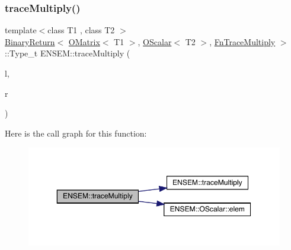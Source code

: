\subsubsection{\texorpdfstring{traceMultiply()}{traceMultiply()}\hspace{0.1cm}{\footnotesize\ttfamily [2/3]}}
{\footnotesize\ttfamily template$<$class T1 , class T2 $>$ \\
\mbox{\hyperlink{structENSEM_1_1BinaryReturn}{Binary\+Return}}$<$ \mbox{\hyperlink{classENSEM_1_1OMatrix}{O\+Matrix}}$<$ T1 $>$, \mbox{\hyperlink{classENSEM_1_1OScalar}{O\+Scalar}}$<$ T2 $>$, \mbox{\hyperlink{structENSEM_1_1FnTraceMultiply}{Fn\+Trace\+Multiply}} $>$\+::Type\+\_\+t E\+N\+S\+E\+M\+::trace\+Multiply (\begin{DoxyParamCaption}\item[{const \mbox{\hyperlink{classENSEM_1_1OMatrix}{O\+Matrix}}$<$ T1 $>$ \&}]{l,  }\item[{const \mbox{\hyperlink{classENSEM_1_1OScalar}{O\+Scalar}}$<$ T2 $>$ \&}]{r }\end{DoxyParamCaption})\hspace{0.3cm}{\ttfamily [inline]}}

Here is the call graph for this function\+:\nopagebreak
\begin{figure}[H]
\begin{center}
\leavevmode
\includegraphics[width=350pt]{d8/d55/group__obsmatrix_ga465cbe792dfb205b829f653853253e8f_cgraph}
\end{center}
\end{figure}
\mbox{\label{group__obsmatrix_gab9e4e0bccae4aa80554908fd966782e1}} 
